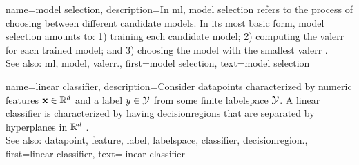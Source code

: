 {name={model selection},
	description={In \gls{ml}, \gls{model} selection refers to the 
		process of choosing between different candidate \glspl{model}. In its most 
		basic form, \gls{model} selection amounts to: 1) training each candidate \gls{model}; 
		2) computing the \gls{valerr} for each trained \gls{model}; and 3) choosing the \gls{model} 
		with the smallest \gls{valerr} \cite[Ch. 6]{MLBasics}. 
				\\
		See also: \gls{ml}, \gls{model}, \gls{valerr}.},
	first={model selection},
	text={model selection}  
}


{name={linear classifier}, 
	description={Consider \glspl{datapoint} characterized by numeric \glspl{feature} ${\bf x} \in \mathbb{R}^{d}$ 
	    	and a \gls{label} $y \in \mathcal{Y}$ from some finite \gls{labelspace} $\mathcal{Y}$. 
		A linear \gls{classifier} is characterized by having \glspl{decisionregion} that are 
		separated by hyperplanes in $\mathbb{R}^{d}$ \cite[Ch. 2]{MLBasics}.
				\\
		See also: \gls{datapoint}, \gls{feature}, \gls{label}, \gls{labelspace}, \gls{classifier}, \gls{decisionregion}.},
	first={linear classifier},
	text={linear classifier} 
}


